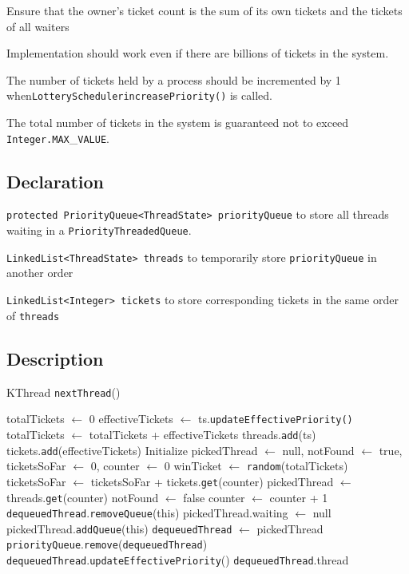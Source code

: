 \documentclass{article}
\begin{document}
\begin{spacing}{1.1}
\begin{asparaitem}
\item Ensure that the owner's ticket count is the sum of its own tickets and the tickets of all waiters
\item Implementation should work even if there are billions of tickets in the system.
\item The number of tickets held by a process should be incremented by 1 when\linebreak \texttt{LotterySchedulerincreasePriority()} is called.
\item The total number of tickets in the system is guaranteed not to exceed \texttt{Integer.MAX}\_\texttt{VALUE}.
\end{asparaitem}

\subsection{Declaration}

\texttt{protected PriorityQueue<ThreadState> priorityQueue} to store all threads waiting in a \texttt{PriorityThreadedQueue}.

\texttt{LinkedList<ThreadState> threads} to temporarily store \texttt{priorityQueue} in another order

\texttt{LinkedList<Integer> tickets} to store corresponding tickets in the same order of \texttt{threads}

\subsection{Description}

\begin{algorithm}[htbp]
  \caption{KThread \texttt{nextThread}()}
\begin{algorithmic}[1]
  \STATE totalTickets $\gets$ 0
    \STATE effectiveTickets $\gets$ ts.\texttt{updateEffectivePriority()}
    \STATE totalTickets $\gets$ totalTickets + effectiveTickets
    \STATE threads.\texttt{add}(ts)
    \STATE tickets.\texttt{add}(effectiveTickets)
  \ENDFOR
  \STATE Initialize pickedThread $\leftarrow$ null, notFound $\leftarrow$ true, ticketsSoFar $\leftarrow$ 0, counter $\leftarrow$ 0
  \STATE winTicket $\leftarrow$ \texttt{random}(totalTickets)
    \STATE ticketsSoFar $\leftarrow$ ticketsSoFar + tickets.\texttt{get}(counter)
      \STATE pickedThread $\leftarrow$ threads.\texttt{get}(counter)
      \STATE notFound $\leftarrow$ false
    \ENDIF
    \STATE counter $\leftarrow$ counter + 1
  \ENDWHILE
  \STATE \texttt{dequeuedThread}.\texttt{removeQueue}(this)
  \STATE pickedThread.waiting $\leftarrow$ null
  \STATE pickedThread.\texttt{addQueue}(this)
  \STATE \texttt{dequeuedThread} $\leftarrow$ pickedThread
  \STATE \texttt{priorityQueue}.\texttt{remove}(\texttt{dequeuedThread})
  \STATE \texttt{dequeuedThread}.\texttt{updateEffectivePriority}()
  \RETURN \texttt{dequeuedThread}.thread
\end{algorithmic}
\end{algorithm}


\end{spacing}
\end{document}
